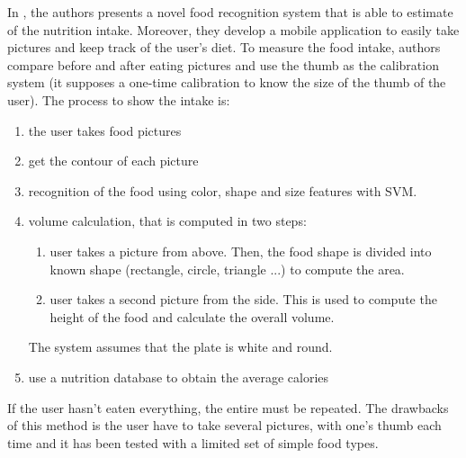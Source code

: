 In \cite{Almaghrabi2012a}, the authors presents a novel food recognition system that is able to estimate of the nutrition intake. Moreover, they develop a mobile application to easily take pictures and keep track of the user's diet.
To measure the food intake, authors compare before and after eating pictures and use the thumb as the calibration system (it supposes a one-time calibration to know the size of the thumb of the user).
The process to show the intake is:
\begin{enumerate}
    \item the user takes food pictures
    \item get the contour of each picture
    \item recognition of the food using color, shape and size features with SVM.
    \item volume calculation, that is computed in two steps:
    \begin{enumerate}
        \item user takes a picture from above. Then, the food shape is divided into known shape (rectangle, circle, triangle ...) to compute the area.
        \item user takes a second picture from the side. This is used to compute the height of the food and calculate the overall volume.
    \end{enumerate}
    The system assumes that the plate is white and round.
    \item use a nutrition database to obtain the average calories
\end{enumerate}
If the user hasn't eaten everything, the entire must be repeated.
The drawbacks of this method is the user have to take several pictures, with one's thumb each time and it has been tested with a limited set of simple food types.

